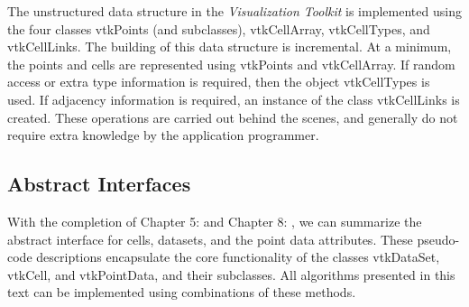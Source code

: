 The unstructured data structure in the \emph{Visualization Toolkit} is implemented using the four classes vtkPoints (and subclasses), vtkCellArray, vtkCellTypes, and vtkCellLinks. The building of this data structure is incremental. At a minimum, the points and cells are represented using vtkPoints and vtkCellArray. If random access or extra type information is required, then the object vtkCellTypes is used. If adjacency information is required, an instance of the class vtkCellLinks is created. These operations are carried out behind the scenes, and generally do not require extra knowledge by the application programmer.

\clearpage

\subsection{Abstract Interfaces}

With the completion of Chapter 5:  and Chapter 8: , we can summarize the abstract interface for cells, datasets, and the point data attributes. These pseudo-code descriptions encapsulate the core functionality of the classes vtkDataSet, vtkCell, and vtkPointData, and their subclasses. All algorithms presented in this text can be implemented using combinations of these methods.

